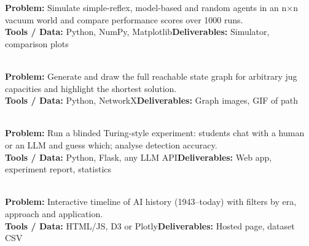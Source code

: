 \documentclass[11pt]{article}
\begin{document}
\begin{tcolorbox}[enhanced,breakable,colback=white,colframe=teal,arc=2mm,boxrule=0.9pt,
  title={\textbf{PI.02\quad Vacuum-World Agent Simulator}\hfill \colorbox{white}{\textcolor{teal}{\scriptsize\bfseries MINI}}},fonttitle=\color{white},colbacktitle=teal]
\textbf{\color{navy}Problem:} Simulate simple-reflex, model-based and random agents in an n$\times$n vacuum world and compare performance scores over 1000 runs.\\[2pt]
\textbf{\color{navy}Tools / Data:} Python, NumPy, Matplotlib\qquad \textbf{\color{navy}Deliverables:} Simulator, comparison plots\\[2pt]
\ 
\end{tcolorbox}
\begin{tcolorbox}[enhanced,breakable,colback=white,colframe=teal,arc=2mm,boxrule=0.9pt,
  title={\textbf{PI.03\quad Water-Jug State-Space Visualiser}\hfill \colorbox{white}{\textcolor{teal}{\scriptsize\bfseries MINI}}},fonttitle=\color{white},colbacktitle=teal]
\textbf{\color{navy}Problem:} Generate and draw the full reachable state graph for arbitrary jug capacities and highlight the shortest solution.\\[2pt]
\textbf{\color{navy}Tools / Data:} Python, NetworkX\qquad \textbf{\color{navy}Deliverables:} Graph images, GIF of path\\[2pt]
\ 
\end{tcolorbox}
\begin{tcolorbox}[enhanced,breakable,colback=white,colframe=crimson,arc=2mm,boxrule=0.9pt,
  title={\textbf{PI.04\quad Turing Test Chat Arena}\hfill \colorbox{white}{\textcolor{crimson}{\scriptsize\bfseries MAJOR}}},fonttitle=\color{white},colbacktitle=crimson]
\textbf{\color{navy}Problem:} Run a blinded Turing-style experiment: students chat with a human or an LLM and guess which; analyse detection accuracy.\\[2pt]
\textbf{\color{navy}Tools / Data:} Python, Flask, any LLM API\qquad \textbf{\color{navy}Deliverables:} Web app, experiment report, statistics\\[2pt]
\ 
\end{tcolorbox}
\begin{tcolorbox}[enhanced,breakable,colback=white,colframe=teal,arc=2mm,boxrule=0.9pt,
  title={\textbf{PI.05\quad AI Timeline Explorer}\hfill \colorbox{white}{\textcolor{teal}{\scriptsize\bfseries MINI}}},fonttitle=\color{white},colbacktitle=teal]
\textbf{\color{navy}Problem:} Interactive timeline of AI history (1943--today) with filters by era, approach and application.\\[2pt]
\textbf{\color{navy}Tools / Data:} HTML/JS, D3 or Plotly\qquad \textbf{\color{navy}Deliverables:} Hosted page, dataset CSV\\[2pt]
\ 
\end{tcolorbox}
\end{document}
